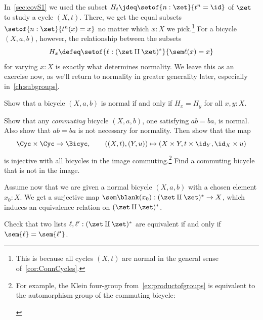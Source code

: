 In~\cref{sec:covS1} we used the subset $H_t \jdeq \setof{n:\zet}{t^n=\id}$
of $\zet$ to study a cycle $(X,t)$. There, we get the equal subsets
$\setof{n:\zet}{t^n(x)=x}$ no matter which $x:X$ we pick.\footnote{%
  This is because all cycles $(X,t)$ are normal
  in the general sense of~\cref{cor:ConnCycles}.}
For a bicycle $(X,a,b)$, however, the relationship between
the subsets
\[
  H_x \defeq \setof{\ell:(\zet\amalg\zet)^*}{\sem\ell(x)=x}
\]
for varying $x:X$ is exactly what determines normality.
We leave this as an exercise now, as we'll return to normality
in greater generality later, especially in~\cref{ch:subgroups}.
\begin{xca}\label{xca:bicycle-normal-iff-Hx=Hy}
  Show that a bicycle $(X,a,b)$ is normal if and only if
  $H_x = H_y$ for all $x,y:X$.
\end{xca}
\begin{xca}\label{xca:bicycle-normal-if-commuting}
  Show that any \emph{commuting} bicycle $(X,a,b)$, \ie
  one satisfying $ab=ba$, is normal. Also show that $ab=ba$ is
  not necessary for normality. Then show that the map
  \[
    \Cyc\times\Cyc\to\Bicyc,\qquad
    ((X,t), (Y,u)) \mapsto (X\times Y, t\times\id_Y, \id_X\times u)
  \]
  is injective with all bicycles in the image commuting.\footnote{%
    For example, the Klein four-group
    from~\cref{ex:productofgroups}
    is equivalent to the automorphism group
    of the commuting bicycle:
  \begin{center}
    \noindent{}
  \end{center}}
Find a commuting bicycle that is not in the image.
\end{xca}

Assume now that we are given a normal bicycle $(X,a,b)$
with a chosen element $x_0:X$.
We get a surjective map $\sem\blank(x_0) : (\zet\amalg\zet)^* \to X$,
which induces an equivalence relation on $(\zet\amalg\zet)^*$.
\begin{xca}\label{xca:bicycle-list-equivalence}
  Check that two lists $\ell,\ell' : (\zet\amalg\zet)^*$
  are equivalent if and only if
  $\sem{\ell} = \sem{\ell'}$.
\end{xca}

